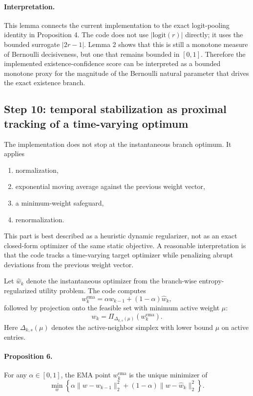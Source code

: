 \paragraph{Interpretation.}
This lemma connects the current implementation to the exact logit-pooling identity in Proposition 4. The code does not use $|\mathrm{logit}(r)|$ directly; it uses the bounded surrogate $|2r-1|$. Lemma 2 shows that this is still a monotone measure of Bernoulli decisiveness, but one that remains bounded in $[0,1]$. Therefore the implemented existence-confidence score can be interpreted as a bounded monotone proxy for the magnitude of the Bernoulli natural parameter that drives the exact existence branch.

\subsection*{Step 10: temporal stabilization as proximal tracking of a time-varying optimum}

The implementation does not stop at the instantaneous branch optimum. It applies
\begin{enumerate}
\item normalization,
\item exponential moving average against the previous weight vector,
\item a minimum-weight safeguard,
\item renormalization.
\end{enumerate}

This part is best described as a heuristic dynamic regularizer, not as an exact closed-form optimizer of the same static objective. A reasonable interpretation is that the code tracks a time-varying target optimizer while penalizing abrupt deviations from the previous weight vector.

Let $\hat w_{k}$ denote the instantaneous optimizer from the branch-wise entropy-regularized utility problem. The code computes
\begin{equation}
w_{k}^{\mathrm{ema}} = \alpha w_{k-1} + (1-\alpha)\hat w_k,
\end{equation}
followed by projection onto the feasible set with minimum active weight $\mu$:
\begin{equation}
w_k = \Pi_{\Delta_{k,s}(\mu)}\!\left(w_k^{\mathrm{ema}}\right).
\end{equation}
Here $\Delta_{k,s}(\mu)$ denotes the active-neighbor simplex with lower bound $\mu$ on active entries.

\paragraph{Proposition 6.}
For any $\alpha \in [0,1]$, the EMA point $w_k^{\mathrm{ema}}$ is the unique minimizer of
\begin{equation}
\min_{w}
\left\{
\alpha \|w-w_{k-1}\|_2^2 + (1-\alpha)\|w-\hat w_k\|_2^2
\right\}.
\label{eq:ema-proximal}
\end{equation}

